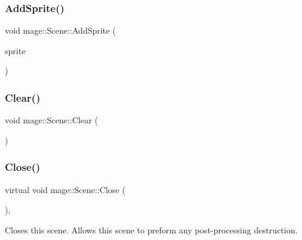 \hypertarget{classmage_1_1_scene_a735a4eba6bf6a072195f1cfc58dfca47}{}\label{classmage_1_1_scene_a735a4eba6bf6a072195f1cfc58dfca47} 
\subsubsection{\texorpdfstring{Add\+Sprite()}{AddSprite()}}
{\footnotesize\ttfamily void mage\+::\+Scene\+::\+Add\+Sprite (\begin{DoxyParamCaption}\item[{\hyperlink{namespacemage_a1e01ae66713838a7a67d30e44c67703e}{Shared\+Ptr}$<$ \hyperlink{classmage_1_1_sprite_object}{Sprite\+Object} $>$}]{sprite }\end{DoxyParamCaption})}

\hypertarget{classmage_1_1_scene_a916cc7a0867bf1c09e5d10de53192140}{}\label{classmage_1_1_scene_a916cc7a0867bf1c09e5d10de53192140} 
\subsubsection{\texorpdfstring{Clear()}{Clear()}}
{\footnotesize\ttfamily void mage\+::\+Scene\+::\+Clear (\begin{DoxyParamCaption}{ }\end{DoxyParamCaption})\hspace{0.3cm}{\ttfamily [private]}}

\hypertarget{classmage_1_1_scene_a16786d7fcf0b813e2e94061b082cfd1d}{}\label{classmage_1_1_scene_a16786d7fcf0b813e2e94061b082cfd1d} 
\subsubsection{\texorpdfstring{Close()}{Close()}}
{\footnotesize\ttfamily virtual void mage\+::\+Scene\+::\+Close (\begin{DoxyParamCaption}{ }\end{DoxyParamCaption})\hspace{0.3cm}{\ttfamily [private]}, {\ttfamily [virtual]}}

Closes this scene. Allows this scene to preform any post-\/processing destruction. \hypertarget{classmage_1_1_scene_a5928fe1e71e816f6b13d055ee5dfa239}{}\label{classmage_1_1_scene_a5928fe1e71e816f6b13d055ee5dfa239} 
